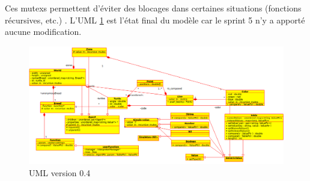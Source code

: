 Ces mutexs permettent d'éviter des blocages dans certaines situations (fonctions récursives, etc.) .
L'UML \ref{v0.4} est l'état final du modèle car le sprint 5 n'y a apporté aucune modification.
\begin{figure}[h]
\includegraphics[scale=0.4]{doc/report/uml/v04.png}
\caption{\label{v0.4} UML version 0.4}
\end{figure}

